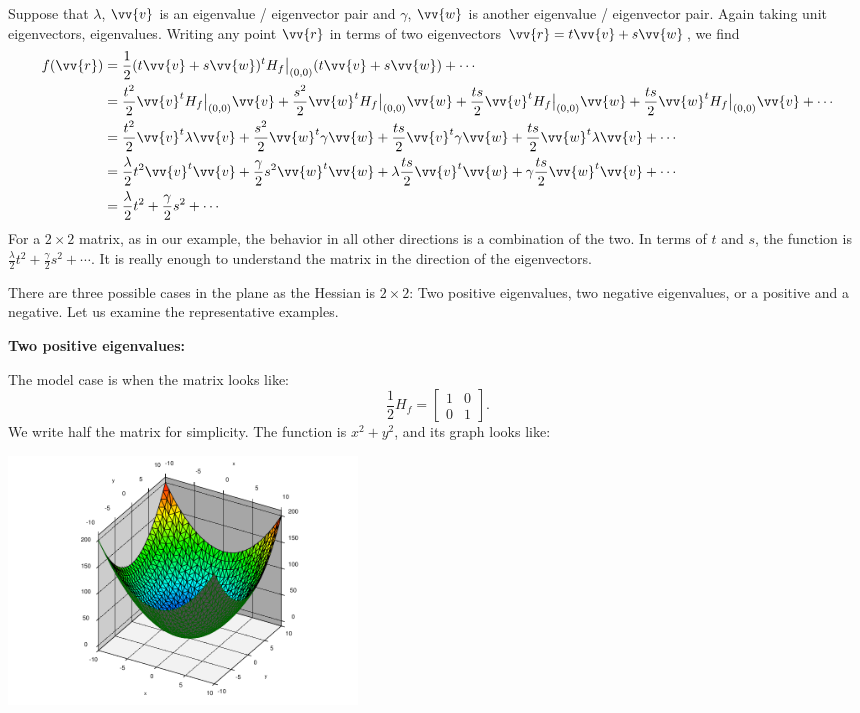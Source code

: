 \documentclass[12pt]{article}
\begin{document}
Suppose that $\lambda$, $\vv{v}$ is an eigenvalue / eigenvector pair
and $\gamma$, $\vv{w}$ is another eigenvalue / eigenvector pair.  Again
taking unit eigenvectors, eigenvalues.
Writing any point $\vv{r}$ in terms of two eigenvectors
$\vv{r} = t \vv{v} + s \vv{w}$, we find
\[
\begin{split}
f(\vv{r}) & = 
\frac{1}{2} (t \vv{v} + s \vv{w})^{t} H_f\big|_{(0,0)} (t \vv{v} + s \vv{w})
+
\cdots 
\\
& =
\frac{t^2}{2} \vv{v}^{t} H_f\big|_{(0,0)} \vv{v}
+
\frac{s^2}{2} \vv{w}^{t} H_f\big|_{(0,0)} \vv{w}
+
\frac{ts}{2} \vv{v}^{t} H_f\big|_{(0,0)} \vv{w}
+
\frac{ts}{2} \vv{w}^{t} H_f\big|_{(0,0)} \vv{v}
+
\cdots 
\\
& =
\frac{t^2}{2} \vv{v}^{t} \lambda \vv{v}
+
\frac{s^2}{2} \vv{w}^{t} \gamma \vv{w}
+
\frac{ts}{2} \vv{v}^{t} \gamma \vv{w}
+
\frac{ts}{2} \vv{w}^{t} \lambda \vv{v}
+
\cdots 
\\
& =
\frac{\lambda}{2} t^2 \vv{v}^{t} \vv{v}
+
\frac{\gamma}{2} s^2 \vv{w}^{t} \vv{w}
+
\lambda \frac{ts}{2} \vv{v}^{t} \vv{w}
+
\gamma \frac{ts}{2} \vv{w}^{t} \vv{v}
+
\cdots 
\\
& =
\frac{\lambda}{2} t^2
+
\frac{\gamma}{2} s^2
+
\cdots 
\end{split}
\]
For a $2 \times 2$ matrix, as in our example, the behavior
in all other directions is a combination of the two.  In terms
of $t$ and $s$, the function is $\frac{\lambda}{2} t^2 + \frac{\gamma}{2}
s^2 + \cdots$.
It is really
enough to understand the matrix in the direction of the eigenvectors.

There are three possible cases in the plane as the Hessian
is $2 \times 2$:  Two positive eigenvalues,
two negative eigenvalues, or a positive and a negative.
Let us examine the representative examples.

\bigskip

\textbf{Two positive eigenvalues:}
\nopagebreak

The model case is when the matrix looks like:
\[
\frac{1}{2} H_f
=
\begin{bmatrix}
1 & 0 \\
0 & 1
\end{bmatrix} .
\]
We write half the matrix for simplicity.
The function is $x^2+y^2$, and
its graph looks like:
\begin{center}
\includegraphics[width=3.65in]{xsqplusysq}
\end{center}
\end{document}
